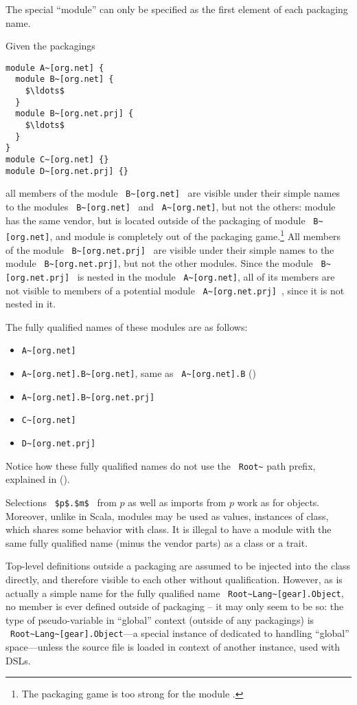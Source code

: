 The special  ``module'' can only be specified as the first element of each packaging name. 

\example Given the packagings
\begin{lstlisting}
module A~[org.net] {
  module B~[org.net] {
    $\ldots$
  }
  module B~[org.net.prj] {
    $\ldots$
  }
}
module C~[org.net] {}
module D~[org.net.prj] {}
\end{lstlisting}
all members of the module ~\lstinline!B~[org.net]!~ are visible under their simple names to the modules ~\lstinline!B~[org.net]!~ and ~\lstinline!A~[org.net]!, but not the others: module  has the same vendor, but is located outside of the packaging of module ~\lstinline!B~[org.net]!, and module  is completely out of the packaging game.\footnote{The packaging game is too strong for the module .} All members of the module ~\lstinline!B~[org.net.prj]!~ are visible under their simple names to the module ~\lstinline!B~[org.net.prj]!, but not the other modules. Since the module ~\lstinline!B~[org.net.prj]!~ is nested in the module ~\lstinline!A~[org.net]!, all of its members are not visible to members of a potential module ~\lstinline!A~[org.net.prj]!~, since it is not nested in it. 

The fully qualified names of these modules are as follows: 
\begin{itemize}
\item \lstinline!A~[org.net]!
\item \lstinline!A~[org.net].B~[org.net]!, same as ~\lstinline!A~[org.net].B! ()
\item \lstinline!A~[org.net].B~[org.net.prj]!
\item \lstinline!C~[org.net]!
\item \lstinline!D~[org.net.prj]!
\end{itemize}

Notice how these fully qualified names do not use the ~\lstinline!Root~! path prefix, explained in ().

Selections ~\lstinline!$p$.$m$!~ from $p$ as well as imports from $p$ work as for objects. Moreover, unlike in Scala, modules may be used as values, instances of  class, which shares some behavior with  class. It is illegal to have a module with the same fully qualified name (minus the vendor parts) as a class or a trait. 

Top-level definitions outside a packaging are assumed to be injected into the  class directly, and therefore visible to each other without qualification. However, as  is actually a simple name for the fully qualified name ~\lstinline!Root~Lang~[gear].Object!, no member is ever defined outside of packaging -- it may only seem to be so: the type of  pseudo-variable in ``global'' context (outside of any packagings) is ~\lstinline!Root~Lang~[gear].Object!---a special instance of  dedicated to handling ``global'' space---unless the source file is loaded in context of another instance, used with DSLs. 






